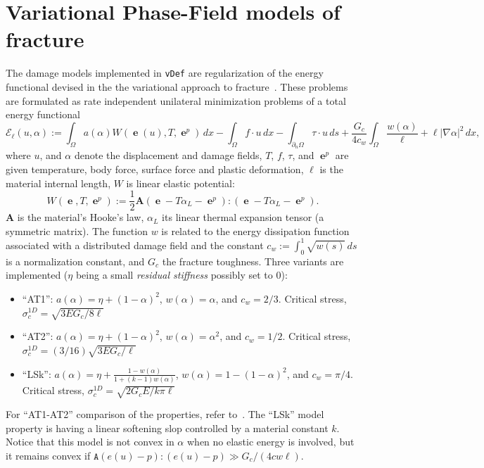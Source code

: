 \documentclass[10pt,oneside]{report}
\def\vDef{{\texttt{vDef}} }
\DeclareMathOperator{\e}{{\mathbf e}}
\begin{document}
\section{Variational Phase-Field models of fracture}
\label{sec:GradientDamageModels}
The damage models implemented in \vDef are regularization of the energy functional devised in the the variational approach to fracture~\cite{Ambrosio-Tortorelli-1990,Ambrosio-Tortorelli-1992,Giacomini-2005,Sicsic-Marigo-2013a}. These problems are formulated as rate independent unilateral minimization problems of a total energy functional
\begin{equation}
	\label{eq:defEll}
	\mathcal{E}_\ell(u,\alpha) := \int_\Omega a(\alpha) W(\e(u),T,\e^p)\, dx - \int_\Omega f\cdot u \, dx - \int_{\partial_n \Omega} \tau \cdot u \, ds + \frac{G_c}{4c_w} \int_\Omega \frac{w(\alpha)}{\ell} + \ell|\nabla \alpha|^2\, dx,
\end{equation}
where $u$, and $\alpha$ denote the displacement and damage fields, $T$, $f$, $\tau$, and $\e^p$ are given temperature, body force, surface force and plastic deformation, $\ell$ is the material internal length, $W$ is linear elastic potential:
$$
W(\e,T,\e^p) := \frac{1}{2} \mathbf{A}\left(\e-T \alpha_L-\e^p\right):\left(\e-T \alpha_L-\e^p\right).
$$
$\mathbf{A}$ is the material's Hooke's law, $\alpha_L$ its linear thermal expansion tensor (a symmetric matrix).
The function $w$ is related to the energy dissipation function associated with a distributed damage field and the constant $c_w:= \int_0^1 \sqrt{w(s)}\, ds$ is a normalization constant, and $G_c$ the fracture toughness.
Three variants are implemented ($\eta$ being a small \emph{residual stiffness} possibly set to 0):
\begin{itemize}
\item ``AT1'': $a(\alpha) = \eta + (1-\alpha)^2$, $w(\alpha) = \alpha$, and $c_w =2/3$. Critical stress, $\sigma_c^{1D} = \sqrt{3EG_c/8\ell}$
\item ``AT2'': $a(\alpha) = \eta + (1-\alpha)^2$, $w(\alpha) = \alpha^2$, and $c_w = 1/2$. Critical stress,  $\sigma_c^{1D} = (3/16) \sqrt{3EG_c/\ell}$
\item ``LSk'': $a(\alpha) =  \eta + \frac{1-w(\alpha)}{1+(k-1)w(\alpha)}$, $w(\alpha) = 1- (1-\alpha)^2$, and $c_w =\pi/4$.  Critical stress, $\sigma_c^{1D} = \sqrt{2G_cE/k\pi\ell}$
\end{itemize}
For ``AT1-AT2'' comparison of the properties, refer to~\cite{Pham-Amor-EtAl-2011a}. The ``LSk'' model property is having a linear softening slop controlled by a material constant $k$. Notice that this model is not convex in $\alpha$ when no elastic energy is involved, but it remains convex if $\mathtt{A}(e(u)-p):(e(u)-p) \gg G_c/(4cw\ell)$.
\end{document}
